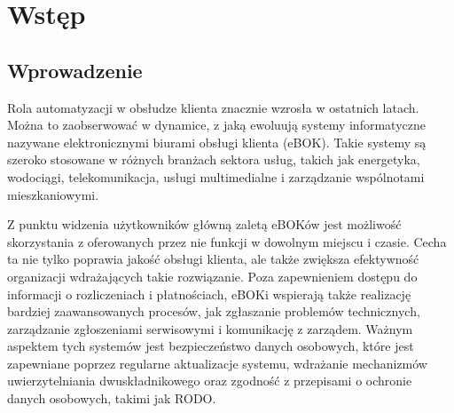 \chapter{Wstęp}
\section{Wprowadzenie}
Rola automatyzacji w obsłudze klienta znacznie wzrosła w ostatnich latach. Można to zaobserwować w dynamice, z jaką ewoluują systemy informatyczne nazywane elektronicznymi biurami obsługi klienta (eBOK). Takie systemy są szeroko stosowane w różnych branżach sektora usług, takich jak energetyka, wodociągi, telekomunikacja, usługi multimedialne i zarządzanie wspólnotami mieszkaniowymi.

Z punktu widzenia użytkowników główną zaletą eBOKów jest możliwość skorzystania z oferowanych przez nie funkcji w dowolnym miejscu i czasie. Cecha ta nie tylko poprawia jakość obsługi klienta, ale także zwiększa efektywność organizacji wdrażających takie rozwiązanie. Poza zapewnieniem dostępu do informacji o rozliczeniach i płatnościach, eBOKi wspierają także realizację bardziej zaawansowanych procesów, jak zgłaszanie problemów technicznych, zarządzanie zgłoszeniami serwisowymi i komunikację z zarządem. Ważnym aspektem tych systemów jest bezpieczeństwo danych osobowych, które jest zapewniane poprzez regularne aktualizacje systemu, wdrażanie mechanizmów uwierzytelniania dwuskładnikowego oraz zgodność z przepisami o ochronie danych osobowych, takimi jak RODO.

